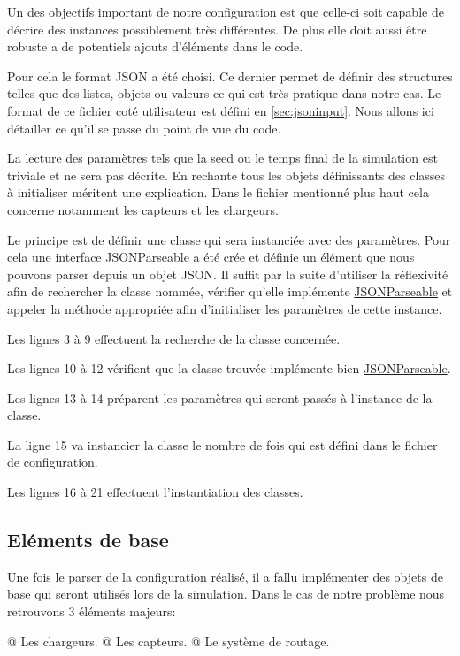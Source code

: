 \documentclass[final]{polytech/polytech}
\newcommand{\klass}[1]{\hyperref[class:#1]{#1}}
\begin{document}
				Un des objectifs important de notre configuration est que celle-ci soit capable de décrire des instances possiblement très différentes.
				De plus elle doit aussi être robuste a de potentiels ajouts d'éléments dans le code.
				
				Pour cela le format JSON a été choisi.
				Ce dernier permet de définir des structures telles que des listes, objets ou valeurs ce qui est très pratique dans notre cas.
				Le format de ce fichier coté utilisateur est défini en \autoref{sec:jsoninput}. Nous allons ici détailler ce qu'il se passe du point de vue du code.
				
				La lecture des paramètres tels que la seed ou le temps final de la simulation est triviale et ne sera pas décrite. 
				En rechante tous les objets définissants des classes à initialiser méritent une explication.
				Dans le fichier mentionné plus haut cela concerne notamment les capteurs et les chargeurs.
				
				Le principe est de définir une classe qui sera instanciée avec des paramètres.
				Pour cela une interface \klass{JSONParseable} a été crée et définie un élément que nous pouvons parser depuis un objet JSON.
				Il suffit par la suite d'utiliser la réflexivité afin de rechercher la classe nommée, vérifier qu'elle implémente \klass{JSONParseable} et appeler la méthode appropriée afin d'initialiser les paramètres de cette instance.
				
				
				Les lignes 3 à 9 effectuent la recherche de la classe concernée.
				
				Les lignes 10 à 12 vérifient que la classe trouvée implémente bien \klass{JSONParseable}.
				
				Les lignes 13 à 14 préparent les paramètres qui seront passés à l'instance de la classe.
				
				La ligne 15 va instancier la classe le nombre de fois qui est défini dans le fichier de configuration.
				
				Les lignes 16 à 21 effectuent l'instantiation des classes.
				
			\subsection{Eléments de base}
				Une fois le parser de la configuration réalisé, il a fallu implémenter des objets de base qui seront utilisés lors de la simulation.
				Dans le cas de notre problème nous retrouvons 3 éléments majeurs:
				\begin{easylist}
					@ Les chargeurs.
					@ Les capteurs.
					@ Le système de routage.
				\end{easylist}
				
\end{document}
